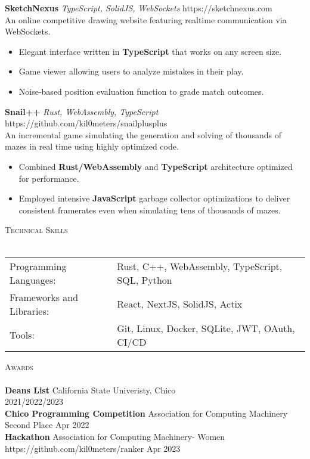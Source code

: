 \documentclass[a4paper]{article}
\newcommand{\lineunder} {
    \vspace*{-8pt} \\
    \hspace*{-18pt} \hrulefill \\
}
\newcommand{\header} [1] {
    {\hspace*{-18pt}\vspace*{6pt} \textsc{#1}}
    \vspace*{-6pt} \lineunder
}
\begin{document}
\vspace*{2mm}
{\textbf{SketchNexus}} {\sl TypeScript, SolidJS, WebSockets} \hfill https://sketchnexus.com\\
An online competitive drawing website featuring realtime communication via WebSockets.\\

    \begin{itemize}
      \item Elegant interface written in \textbf{TypeScript} that works on any screen size.
      \item Game viewer allowing users to analyze mistakes in their play.
      \item Noise-based position evaluation function to grade match outcomes.
    \end{itemize}

\vspace*{2mm}
{\textbf{Snail++}} {\sl Rust, WebAssembly, TypeScript} \hfill https://github.com/kil0meters/snailplusplus\\
An incremental game simulating the generation and solving of thousands of mazes in real time using highly optimized code.\\

    \begin{itemize}
      \item Combined \textbf{Rust/WebAssembly} and \textbf{TypeScript} architecture optimized for performance.
      \item Employed intensive \textbf{JavaScript} garbage collector optimizations to deliver consistent framerates even when simulating tens of thousands of mazes.
    \end{itemize}

\vspace*{2mm}

\header{Technical Skills}
\begin{tabular}{ l l }
	Programming Languages:    & Rust, C++, WebAssembly, TypeScript, SQL, Python \\
	Frameworks and Libraries: & React, NextJS, SolidJS, Actix                   \\
	Tools:                    & Git, Linux, Docker, SQLite, JWT, OAuth, CI/CD   \\
\end{tabular}
\vspace{2mm}

\header{Awards}
\textbf{Dean\textquotesingle{}s List} \hfill California State Univeristy, Chico\\
\hfill 2021/2022/2023\\
\vspace*{2mm}
\textbf{Chico Programming Competition} \hfill Association for Computing Machinery\\
Second Place \hfill Apr 2022\\
\textbf{Hackathon} \hfill Association for Computing Machinery- Women\\
https://github.com/kil0meters/ranker \hfill Apr 2023\\
\vspace*{2mm}

\
\end{document}
